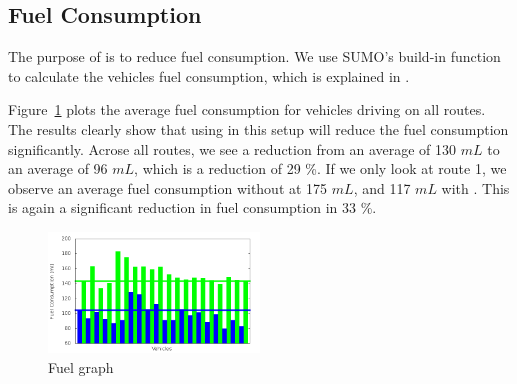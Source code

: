 %
%
%
\subsection{Fuel Consumption}
The purpose of \tech is to reduce fuel consumption. 
We use SUMO's build-in function to calculate the vehicles fuel consumption, which is explained in \cite{SUMOFuel}.

Figure~\ref{fig:TestResults:fuelRoute} plots the average fuel consumption for vehicles driving on all routes. 
The results clearly show that using \tech in this setup will reduce the fuel consumption significantly.
Acrose all routes, we see a reduction from an average of 130 $mL$ to an average of 96 $mL$, which is a reduction of 29 \%.
If we only look at route 1, we observe an average fuel consumption without \tech at 175 $mL$, and 117 $mL$ with \tech.
This is again a significant reduction in fuel consumption in 33 \%. %

\begin{figure}[htb]
\includegraphics[width=0.5\textwidth]{images/tp0/fuelRoute.png}
\caption{Fuel graph}
\label{fig:TestResults:fuelRoute}
\end{figure}


%
%

